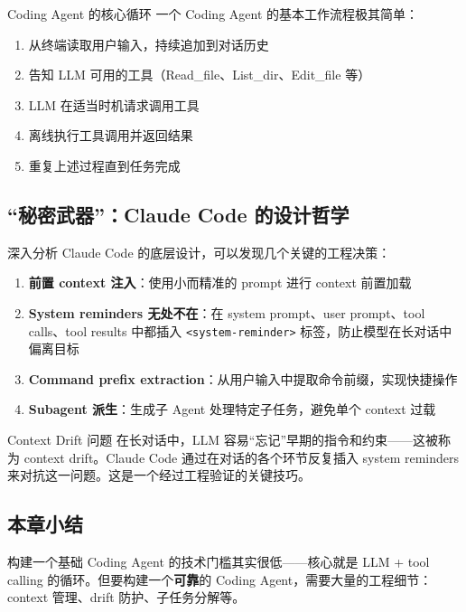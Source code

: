 \documentclass[a4paper]{article}
\begin{document}
\begin{importantbox}{Coding Agent 的核心循环}
一个 Coding Agent 的基本工作流程极其简单：
\begin{enumerate}
    \item 从终端读取用户输入，持续追加到对话历史
    \item 告知 LLM 可用的工具（Read\_file、List\_dir、Edit\_file 等）
    \item LLM 在适当时机请求调用工具
    \item 离线执行工具调用并返回结果
    \item 重复上述过程直到任务完成
\end{enumerate}
\end{importantbox}

\subsection{``秘密武器''：Claude Code 的设计哲学}

深入分析 Claude Code 的底层设计，可以发现几个关键的工程决策：

\begin{enumerate}
    \item \textbf{前置 context 注入}：使用小而精准的 prompt 进行 context 前置加载
    \item \textbf{System reminders 无处不在}：在 system prompt、user prompt、tool calls、tool results 中都插入 \texttt{<system-reminder>} 标签，防止模型在长对话中偏离目标
    \item \textbf{Command prefix extraction}：从用户输入中提取命令前缀，实现快捷操作
    \item \textbf{Subagent 派生}：生成子 Agent 处理特定子任务，避免单个 context 过载
\end{enumerate}

\begin{warningbox}{Context Drift 问题}
在长对话中，LLM 容易``忘记''早期的指令和约束——这被称为 context drift。Claude Code 通过在对话的各个环节反复插入 system reminders 来对抗这一问题。这是一个经过工程验证的关键技巧。
\end{warningbox}

\subsection{本章小结}

构建一个基础 Coding Agent 的技术门槛其实很低——核心就是 LLM + tool calling 的循环。但要构建一个\textbf{可靠}的 Coding Agent，需要大量的工程细节：context 管理、drift 防护、子任务分解等。
\end{document}
